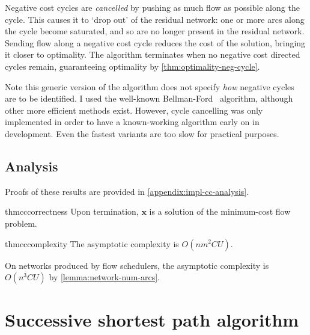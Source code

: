 Negative cost cycles are \emph{cancelled} by pushing as much flow as possible along the cycle. This causes it to `drop out' of the residual network: one or more arcs along the cycle become saturated, and so are no longer present in the residual network. Sending flow along a negative cost cycle reduces the cost of the solution, bringing it closer to optimality. The algorithm terminates when no negative cost directed cycles remain, guaranteeing optimality by \cref{thm:optimality-neg-cycle}.

Note this generic version of the algorithm does not specify \emph{how} negative cycles are to be identified. I used the well-known Bellman-Ford~\cite[p.~651]{CLRS:2009} algorithm, although other more efficient methods exist. However, cycle cancelling was only implemented in order to have a known-working algorithm early on in development. Even the fastest variants are too slow for practical purposes.

\subsection{Analysis}

Proofs of these results are provided in \cref{appendix:impl-cc-analysis}. \\

\begin{restatable}{thm}{cccorrectness}
\label{thm:cycle-cancelling-correctness}
Upon termination, $\mathbf{x}$ is a solution of the minimum-cost flow problem.
\end{restatable} \vspace{0.5em}
\begin{restatable}{thm}{cccomplexity}
\label{thm:cycle-cancelling-complexity}
The asymptotic complexity is $O(nm^2CU)$.
\end{restatable} \vspace{0.5em}
\begin{remark}
On networks produced by flow schedulers, the asymptotic complexity is $O(n^3CU)$ by \cref{lemma:network-num-arcs}.
\end{remark}

\section{Successive shortest path algorithm} \label{sec:impl-ssp}

